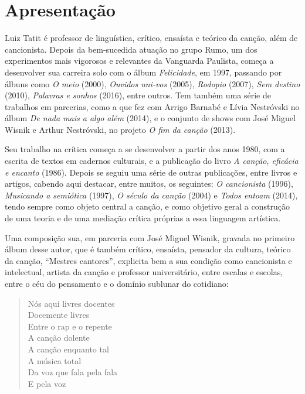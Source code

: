 \chapter{Apresentação}

Luiz Tatit é professor de linguística, crítico, ensaísta e teórico da
canção, além de cancionista. Depois da bem-sucedida atuação no grupo
Rumo, um dos experimentos mais vigorosos e relevantes da Vanguarda
Paulista, começa a desenvolver sua carreira solo com o álbum
\textit{Felicidade}, em 1997, passando por álbuns como \textit{O meio} (2000),
\textit{Ouvidos uni-vos} (2005), \textit{Rodopio} (2007), \textit{Sem destino} (2010),
\textit{Palavras e sonhos} (2016), entre outros. Tem também uma série de
trabalhos em parcerias, como a que fez com Arrigo Barnabé e Lívia
Nestróvski no álbum \textit{De nada mais a algo além} (2014), e o conjunto de shows com
José Miguel Wisnik e Arthur Nestróvski, no projeto \textit{O fim da canção}
(2013).

Seu trabalho na crítica começa a se desenvolver a partir dos anos 1980,
com a escrita de textos em cadernos culturais, e a publicação do livro
\textit{A canção, eficácia e encanto} (1986). Depois se seguiu uma série de
outras publicações, entre livros e artigos, cabendo aqui destacar, entre
muitos, os seguintes: \textit{O cancionista} (1996), \textit{Musicando a
semiótica} (1997), \textit{O século da canção} (2004) e \textit{Todos entoam}
(2014), tendo sempre como objeto central a canção, e como objetivo geral
a construção de uma teoria e de uma mediação crítica próprias a essa
linguagem artística.

Uma composição sua, em parceria com José Miguel Wisnik, gravada no
primeiro álbum desse autor, que é também crítico, ensaísta, pensador da
cultura, teórico da canção, ``Mestres cantores'', explicita bem a sua
condição como cancionista e intelectual, artista da canção e professor
universitário, entre escalas e escolas, entre o céu do pensamento e o
domínio sublunar do cotidiano:

\begin{verse}
Nós aqui livres docentes\\
Docemente livres\\
Entre o rap e o repente\\
A canção dolente\\
A canção enquanto tal\\
A música total\\
Da voz que fala pela fala\\
E pela voz
\end{verse}

